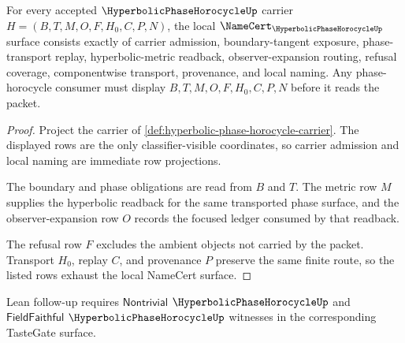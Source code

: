 \begin{theorem}
\label{thm:hyperbolic-phase-horocycle-namecert-obligations}
For every accepted $\HyperbolicPhaseHorocycleUp$ carrier $H=(B,T,M,O,F,H_0,C,P,N)$, the local $\NameCert_{\HyperbolicPhaseHorocycleUp}$ surface consists exactly of carrier admission, boundary-tangent exposure, phase-transport replay, hyperbolic-metric readback, observer-expansion routing, refusal coverage, componentwise transport, provenance, and local naming. Any phase-horocycle consumer must display $B,T,M,O,F,H_0,C,P,N$ before it reads the packet.
\end{theorem}
\begin{proof}
Project the carrier of \autoref{def:hyperbolic-phase-horocycle-carrier}. The displayed rows are the only classifier-visible coordinates, so carrier admission and local naming are immediate row projections.

The boundary and phase obligations are read from $B$ and $T$. The metric row $M$ supplies the hyperbolic readback for the same transported phase surface, and the observer-expansion row $O$ records the focused ledger consumed by that readback.

The refusal row $F$ excludes the ambient objects not carried by the packet. Transport $H_0$, replay $C$, and provenance $P$ preserve the same finite route, so the listed rows exhaust the local NameCert surface.
\end{proof}



Lean follow-up requires $\mathsf{Nontrivial}$ $\HyperbolicPhaseHorocycleUp$ and $\mathsf{FieldFaithful}$ $\HyperbolicPhaseHorocycleUp$ witnesses in the corresponding TasteGate surface.


